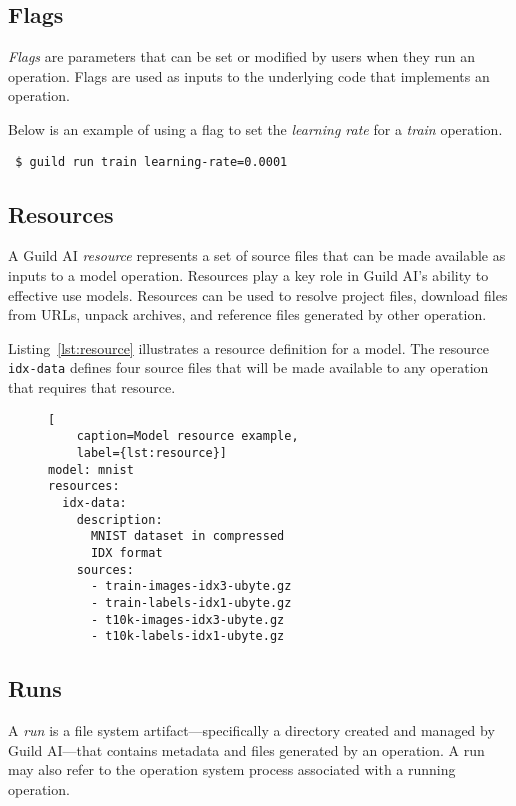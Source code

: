 \documentclass{article}
\begin{document}
\subsection{Flags}

\emph{Flags} are parameters that can be set or modified by users when
they run an operation. Flags are used as inputs to the underlying code
that implements an operation.

Below is an example of using a flag to set the \emph{learning rate}
for a \emph{train} operation.

{\footnotesize
\begin{verbatim}
 $ guild run train learning-rate=0.0001
\end{verbatim}}

\subsection{Resources}
\label{sec:resources}

A Guild AI \emph{resource} represents a set of source files that can
be made available as inputs to a model operation. Resources play a key
role in Guild AI's ability to effective use models. Resources can be
used to resolve project files, download files from URLs, unpack
archives, and reference files generated by other operation.

Listing~\ref{lst:resource} illustrates a resource definition for a
model. The resource \verb|idx-data| defines four source files that
will be made available to any operation that requires that resource.

\begin{figure}
\begin{lstlisting}[
    caption=Model resource example,
    label={lst:resource}]
model: mnist
resources:
  idx-data:
    description:
      MNIST dataset in compressed
      IDX format
    sources:
      - train-images-idx3-ubyte.gz
      - train-labels-idx1-ubyte.gz
      - t10k-images-idx3-ubyte.gz
      - t10k-labels-idx1-ubyte.gz
\end{lstlisting}
\end{figure}

\subsection{Runs}

A \emph{run} is a file system artifact---specifically a directory
created and managed by Guild AI---that contains metadata and files
generated by an operation. A run may also refer to the operation
system process associated with a running operation.
\end{document}
